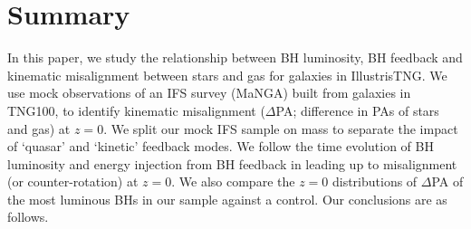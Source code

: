 \documentclass[fleqn,usenatbib]{mnras}
\begin{document}
\section{Summary} \label{sec:conclusion}

In this paper, we study the relationship between BH luminosity, BH feedback and kinematic misalignment between stars and gas for galaxies in IllustrisTNG. We use mock observations of an IFS survey (MaNGA) built from galaxies in TNG100, to identify kinematic misalignment ($\Delta$PA; difference in PAs of stars and gas) at $z=0$. We split our mock IFS sample on mass to separate the impact of `quasar' and `kinetic' feedback modes. We follow the time evolution of BH luminosity and energy injection from BH feedback in leading up to misalignment (or counter-rotation) at $z=0$. We also compare the $z=0$ distributions of $\Delta$PA of the most luminous BHs in our sample against a control. Our conclusions are as follows.
\end{document}

